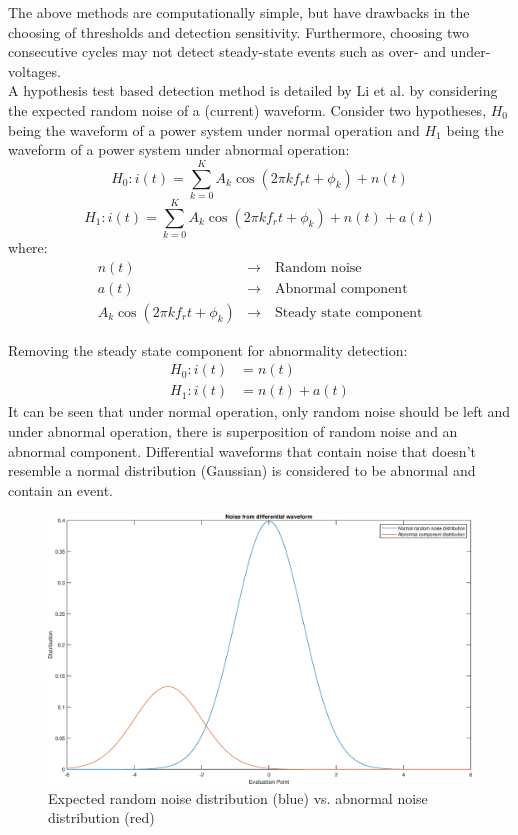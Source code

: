 \documentclass[12pt]{article}
\begin{document}
{The above methods are computationally simple, but have drawbacks in the choosing of thresholds and detection sensitivity. Furthermore, choosing two consecutive cycles may not detect steady-state events such as over- and under-voltages. \newline
\\
A hypothesis test based detection method is detailed by Li et al. \cite{WA} by considering the expected random noise of a (current) waveform. Consider two hypotheses, $H_0$ being the waveform of a power system under normal operation and $H_1$ being the waveform of a power system under abnormal operation:
$$H_0: i(t) = \sum^K_{k=0}A_k\cos(2\pi k f_r t + \phi_k) + n(t)$$
$$H_1: i(t) = \sum^K_{k=0}A_k\cos(2\pi k f_r t + \phi_k) + n(t) + a(t)$$
where:
\begin{align*}
n(t) &\rightarrow \quad \text{Random noise}\\
a(t) &\rightarrow \quad \text{Abnormal component}\\
A_k\cos(2\pi k f_r t + \phi_k) &\rightarrow \quad \text{Steady state component}
\end{align*}

Removing the steady state component for abnormality detection:
\begin{align*}
H_0: i(t) &= n(t)\\
H_1: i(t) &= n(t) + a(t)
\end{align*}
It can be seen that under normal operation, only random noise should be left and under abnormal operation, there is superposition of random noise and an abnormal component. Differential waveforms that contain noise that doesn't resemble a normal distribution (Gaussian) is considered to be abnormal and contain an event.

\begin{figure}[H]
\centering
\includegraphics[scale=0.45]{WAH}
\caption{Expected random noise distribution (blue) vs. abnormal noise distribution (red) }
\end{figure}


}
\end{document}
